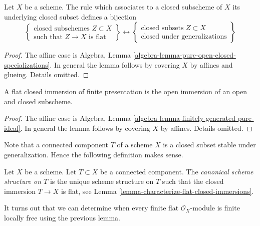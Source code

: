 \begin{lemma}
\label{lemma-characterize-flat-closed-immersions}
Let $X$ be a scheme. The rule which associates to a closed subscheme
of $X$ its underlying closed subset defines a bijection
$$
\left\{
\begin{matrix}
\text{closed subschemes }Z \subset X \\
\text{such that }Z \to X\text{ is flat}
\end{matrix}
\right\}
\leftrightarrow
\left\{
\begin{matrix}
\text{closed subsets }Z \subset X \\
\text{closed under generalizations}
\end{matrix}
\right\}
$$
\end{lemma}

\begin{proof}
The affine case is
Algebra, Lemma \ref{algebra-lemma-pure-open-closed-specializations}.
In general the lemma follows by covering $X$ by affines and glueing.
Details omitted.
\end{proof}

\begin{lemma}
\label{lemma-flat-closed-immersions-finite-presentation}
A flat closed immersion of finite presentation
is the open immersion of an open and closed subscheme.
\end{lemma}

\begin{proof}
The affine case is
Algebra, Lemma \ref{algebra-lemma-finitely-generated-pure-ideal}.
In general the lemma follows by covering $X$ by affines.
Details omitted.
\end{proof}

\noindent
Note that a connected component $T$ of a scheme $X$ is a closed
subset stable under generalization. Hence the following definition
makes sense.

\begin{definition}
\label{definition-scheme-structure-connected-component}
Let $X$ be a scheme. Let $T \subset X$ be a connected component.
The {\it canonical scheme structure on $T$} is the unique
scheme structure on $T$ such that the closed immersion $T \to X$
is flat, see
Lemma \ref{lemma-characterize-flat-closed-immersions}.
\end{definition}

\noindent
It turns out that we can determine when every finite flat
$\mathcal{O}_X$-module is finite locally free using the previous lemma.

